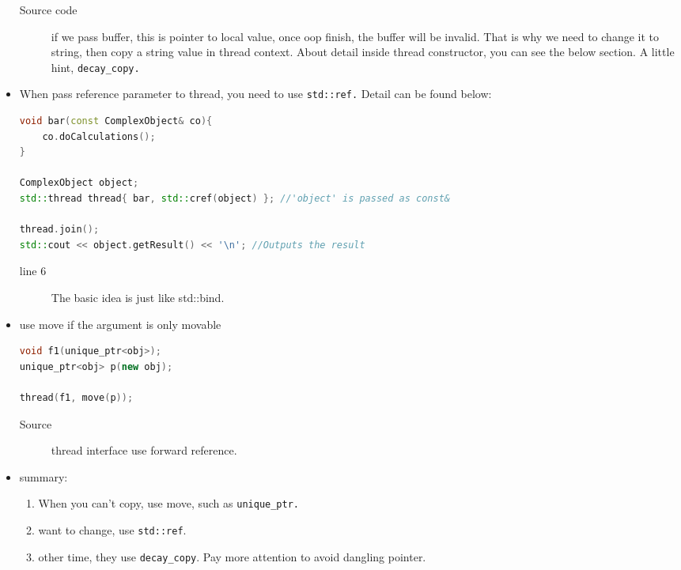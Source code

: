 \documentclass[a4paper,11pt,twoside]{book}
\begin{document}
\begin{itemize}
\begin{description}
		\item[Source code] if we pass buffer, this is pointer to local value, once oop finish, the buffer will be invalid. That is why we need to change it to string, then copy a string value in thread context. About detail inside thread constructor, you can see the below section. A little hint, \texttt{decay\_copy.}
\end{description}

	\item When pass reference parameter to thread, you need to use \texttt{std::ref.} Detail can be found below:
\begin{lstlisting}[frame=single, language=c++]
void bar(const ComplexObject& co){
	co.doCalculations();
}

ComplexObject object;
std::thread thread{ bar, std::cref(object) }; //'object' is passed as const&

thread.join();
std::cout << object.getResult() << '\n'; //Outputs the result
\end{lstlisting}

\begin{description}
	\item[line 6] The basic idea is just like std::bind. 
\end{description}

    \item use move if the argument is only movable
\begin{lstlisting}[frame=single, language=c++]
void f1(unique_ptr<obj>);
unique_ptr<obj> p(new obj);

thread(f1, move(p));
\end{lstlisting}
\begin{description}
	\item[Source] thread interface use forward reference. 
\end{description}

    \item summary:
\begin{enumerate}
		\item When you can't copy, use move, such as \texttt{unique\_ptr.}
		\item want to change, use \texttt{std::ref}.
		\item other time, they use \texttt{decay\_copy}. Pay more attention to avoid dangling pointer.  
\end{enumerate}

\end{itemize}
\end{document}
